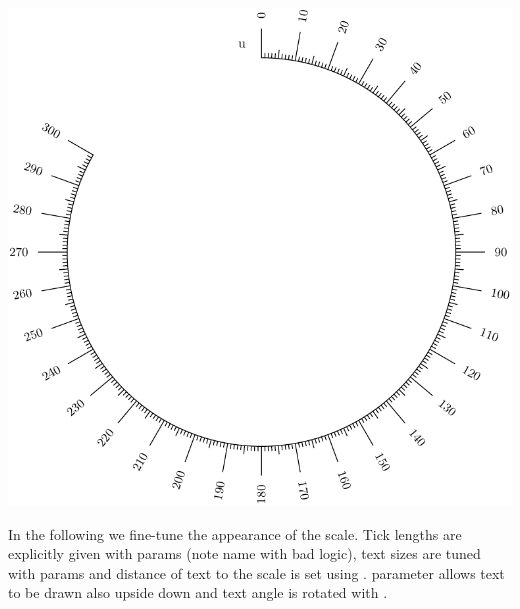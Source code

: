 \documentclass[a4paper,11pt,english]{sphinxmanual}
\begin{document}
\includegraphics{ex_axes_8.pdf}

In the following we fine-tune the appearance of the scale. Tick lengths are explicitly given with params 
(note name with bad logic), text sizes are tuned with params  and distance of text to the scale is set using
.  parameter allows text to be drawn also upside down and text angle is rotated with
.
\end{document}
